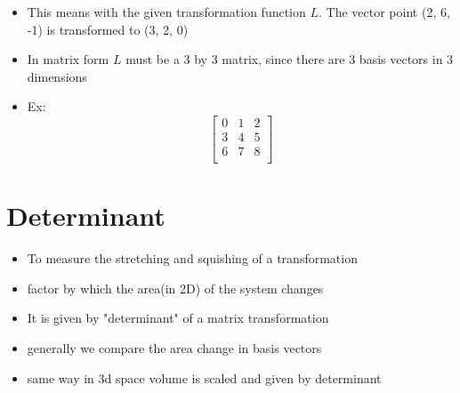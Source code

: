 \documentclass[a4paper]{article}
\begin{document}
\begin{itemize}
	\item This means with the given transformation function
	      $L$. The vector point (2, 6, -1) is transformed
	      to (3, 2, 0)
	\item In matrix form $L$ must be a 3 by 3 matrix, since
	      there are 3 basis vectors in 3 dimensions
	\item Ex:
	      \[
		      \begin{bmatrix} 0 & 1 & 2 \\
                3 & 4 & 5 \\
                6 & 7 & 8 \\\end{bmatrix}
	      \]
\end{itemize}

\newpage
\section{Determinant}
\begin{itemize}
	\item To measure the stretching and squishing of a
	      transformation
	\item factor by which the area(in 2D) of the system
	      changes
	\item It is given by "determinant" of a matrix
	      transformation
	\item generally we compare the area change in basis
	      vectors
	\item same way in 3d space volume is scaled and given
	      by determinant
\end{itemize}
\end{document}
